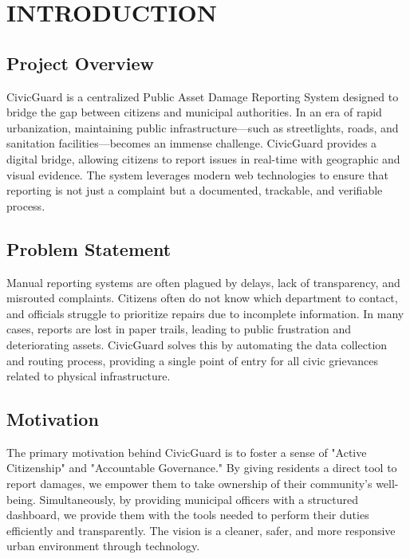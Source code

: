 \chapter{INTRODUCTION}

\section{Project Overview}
CivicGuard is a centralized Public Asset Damage Reporting System designed to bridge the gap between citizens and municipal authorities. In an era of rapid urbanization, maintaining public infrastructure—such as streetlights, roads, and sanitation facilities—becomes an immense challenge. CivicGuard provides a digital bridge, allowing citizens to report issues in real-time with geographic and visual evidence. The system leverages modern web technologies to ensure that reporting is not just a complaint but a documented, trackable, and verifiable process.

\section{Problem Statement}
Manual reporting systems are often plagued by delays, lack of transparency, and misrouted complaints. Citizens often do not know which department to contact, and officials struggle to prioritize repairs due to incomplete information. In many cases, reports are lost in paper trails, leading to public frustration and deteriorating assets. CivicGuard solves this by automating the data collection and routing process, providing a single point of entry for all civic grievances related to physical infrastructure.

\section{Motivation}
The primary motivation behind CivicGuard is to foster a sense of "Active Citizenship" and "Accountable Governance." By giving residents a direct tool to report damages, we empower them to take ownership of their community's well-being. Simultaneously, by providing municipal officers with a structured dashboard, we provide them with the tools needed to perform their duties efficiently and transparently. The vision is a cleaner, safer, and more responsive urban environment through technology.

